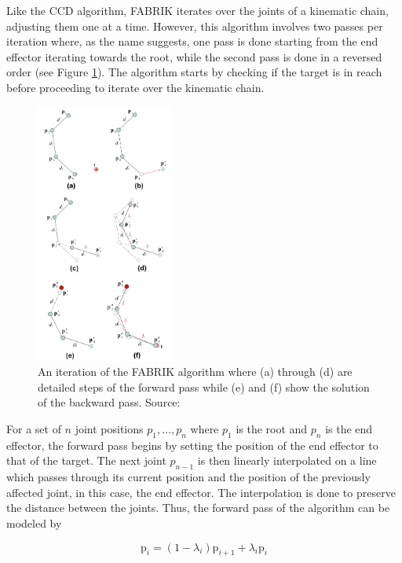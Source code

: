 Like the CCD algorithm, FABRIK iterates over the joints of a kinematic chain,
adjusting them one at a time. However, this algorithm involves two passes per
iteration where, as the name suggests, one pass is done starting from the end
effector iterating towards the root, while the second pass is done in a reversed
order (see Figure \ref{fig:fabrik}). The algorithm starts by checking if the
target is in reach before proceeding to iterate over the kinematic chain. 

\begin{figure}[!h]
    \centering
    \captionsetup{justification=centering}
    \includegraphics[width=0.4\textwidth]{grafika/fabrik_iteration.png}
    \caption{An iteration of the FABRIK algorithm where (a) through (d) are
    detailed steps of the forward pass while (e) and (f) show the solution of
    the backward pass. Source: \cite{Aristidou2011}}
    \label{fig:fabrik}
\end{figure}

For a set of \(n\) joint positions \(p_1, \dots, p_n\) where \(p_1\) is the root
and \(p_n\) is the end effector, the forward pass begins by setting the position
of the end effector to that of the target. The next joint \(p_{n-1}\) is
then linearly interpolated on a line which passes through its current position
and the position of the previously affected joint, in this case, the end
effector. The interpolation is done to preserve the distance between the joints.
Thus, the forward pass of the algorithm can be modeled by 

\begin{equation}
    \mbox{p}_i = (1 - \lambda_i)\mbox{p}_{i+1} + \lambda_i \mbox{p}_i
\end{equation}

